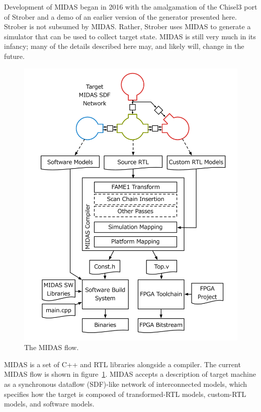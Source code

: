 Development of MIDAS began in 2016 with the amalgamation of the Chisel3 port of
Strober and a demo of an earlier version of the generator presented here.
Strober is not subsumed by MIDAS.  Rather, Strober uses MIDAS to generate a
simulator that can be used to collect target state. MIDAS is still very much in
its infancy; many of the details described here may, and likely will, change in
the future.

\begin{figure}
	\centering
	\includegraphics[width=16cm]{figures/toolchain.pdf}
    \caption{The MIDAS flow.}
	\label{fig:midas}
\end{figure}

MIDAS is a set of C++ and RTL libraries alongside a compiler. The current MIDAS
flow is shown in figure~\ref{fig:midas}. MIDAS accepts a description of target
machine as a synchronous dataflow (SDF)-like network of interconnected models,
which specifies how the target is composed of transformed-RTL models,
custom-RTL models, and software models.

